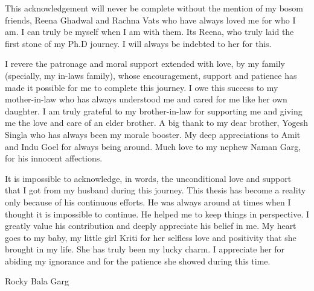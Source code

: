 This acknowledgement will never be complete without the mention of my bosom friends, Reena Ghadwal and Rachna Vats who have always loved me for who I am.
I can truly be myself when I am with them. Its Reena, who truly laid the first stone of my Ph.D journey. I will always be indebted to her for this. 

I revere the patronage and moral support extended with love, by my family (specially, my in-laws family), whose encouragement, support and patience
has made it possible  for me to complete this journey. I owe this success to my mother-in-law who has always understood me and cared for me like her
own daughter. I am truly grateful to my brother-in-law for supporting me and giving me the love and care of an elder brother.  
A big thank to my dear brother, Yogesh Singla who has always been my morale booster. 
My deep appreciations to Amit and Indu Goel for always being around. Much love to my nephew Naman Garg, for his innocent affections. 

It is impossible to acknowledge, in words, the unconditional love and support that I got from my husband during this journey. This thesis has become a reality only
because of his continuous efforts. He was always around at times when I thought it is
impossible to continue. He helped me to keep things in perspective. I greatly value his contribution and deeply appreciate his belief in me. 
My heart goes to my baby, my little girl Kriti for her selfless love and positivity that she brought in my life. She has truly been my lucky charm.
I appreciate her for abiding my ignorance and for the patience she showed during this time. 

\vspace{0.1in}
\begin{flushright}
{\large Rocky Bala Garg}
\end{flushright}



